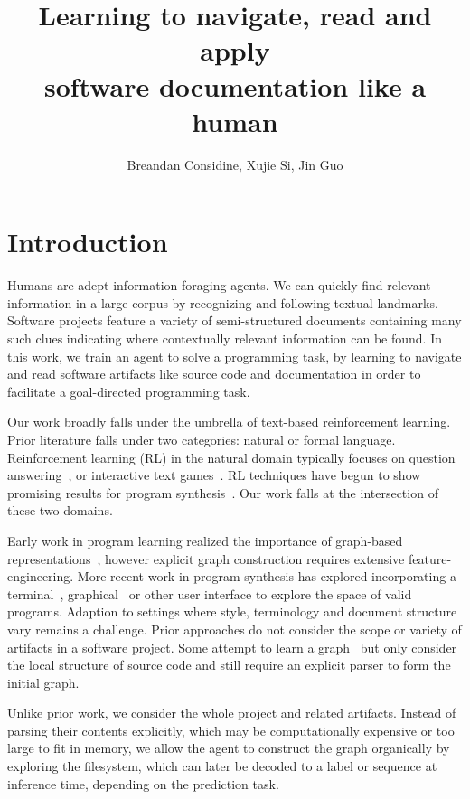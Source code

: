 \documentclass[11pt]{article}
\title{Learning to navigate, read and apply\\software documentation like a human}
\author{Breandan Considine, Xujie Si, Jin Guo}
\begin{document}
\maketitle

\section{Introduction}

Humans are adept information foraging agents. We can quickly find relevant information in a large corpus by recognizing and following textual landmarks. Software projects feature a variety of semi-structured documents containing many such clues indicating where contextually relevant information can be found. In this work, we train an agent to solve a programming task, by learning to navigate and read software artifacts like source code and documentation in order to facilitate a goal-directed programming task.

Our work broadly falls under the umbrella of text-based reinforcement learning. Prior literature falls under two categories: natural or formal language. Reinforcement learning (RL) in the natural domain typically focuses on question answering~\cite{buck2017ask, chen2019reinforcement}, or interactive text games~\cite{he2015deep,ammanabrolu2018playing,narasimhan2015language,guo2020interactive,ammanabrolu2020graph}. RL techniques have begun to show promising results for program synthesis~\cite{ellis2019write, johnson2020learning, chen2020program}. Our work falls at the intersection of these two domains.

Early work in program learning realized the importance of graph-based representations~\cite{allamanis2017learning}, however explicit graph construction requires extensive feature-engineering. More recent work in program synthesis has explored incorporating a terminal~\cite{ellis2019write}, graphical~\cite{walke2020learning} or other user interface to explore the space of valid programs. Adaption to settings where style, terminology and document structure vary remains a challenge. Prior approaches do not consider the scope or variety of artifacts in a software project. Some attempt to learn a graph~\cite{johnson2020learning} but only consider the local structure of source code and still require an explicit parser to form the initial graph.

Unlike prior work, we consider the whole project and related artifacts. Instead of parsing their contents explicitly, which may be computationally expensive or too large to fit in memory, we allow the agent to construct the graph organically by exploring the filesystem, which can later be decoded to a label or sequence at inference time, depending on the prediction task.
\end{document}
